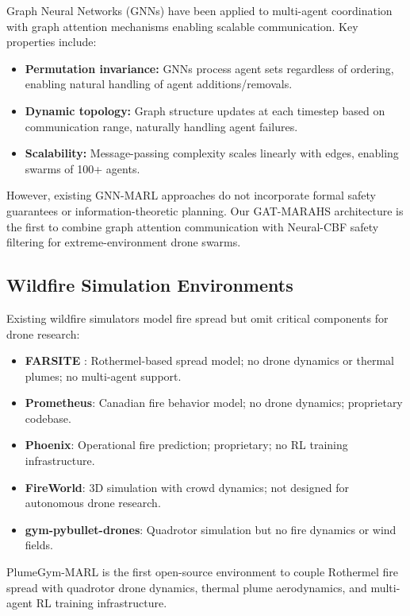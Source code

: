 \documentclass[12pt,a4paper]{article}
\begin{document}
Graph Neural Networks (GNNs) have been applied to multi-agent coordination \cite{Rizk2019} with graph attention mechanisms enabling scalable communication. Key properties include:

\begin{itemize}[leftmargin=*]
    \item \textbf{Permutation invariance:} GNNs process agent sets regardless of ordering, enabling natural handling of agent additions/removals.
    \item \textbf{Dynamic topology:} Graph structure updates at each timestep based on communication range, naturally handling agent failures.
    \item \textbf{Scalability:} Message-passing complexity scales linearly with edges, enabling swarms of 100+ agents.
\end{itemize}

However, existing GNN-MARL approaches do not incorporate formal safety guarantees or information-theoretic planning. Our GAT-MARAHS architecture is the first to combine graph attention communication with Neural-CBF safety filtering for extreme-environment drone swarms.

\subsection{Wildfire Simulation Environments}

Existing wildfire simulators model fire spread but omit critical components for drone research:

\begin{itemize}[leftmargin=*]
    \item \textbf{FARSITE} \cite{Holland2010}: Rothermel-based spread model; no drone dynamics or thermal plumes; no multi-agent support.
    \item \textbf{Prometheus}: Canadian fire behavior model; no drone dynamics; proprietary codebase.
    \item \textbf{Phoenix}: Operational fire prediction; proprietary; no RL training infrastructure.
    \item \textbf{FireWorld}: 3D simulation with crowd dynamics; not designed for autonomous drone research.
    \item \textbf{gym-pybullet-drones}: Quadrotor simulation but no fire dynamics or wind fields.
\end{itemize}

PlumeGym-MARL is the first open-source environment to couple Rothermel fire spread with quadrotor drone dynamics, thermal plume aerodynamics, and multi-agent RL training infrastructure.
\end{document}
